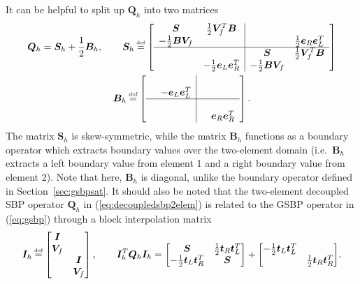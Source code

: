\documentclass[review,onefignum,onetabnum,final]{siamart171218}
\newcommand{\LRs}[1]{\left[ #1 \right]}
\newcommand\myeq{\mathrel{\stackrel{\makebox[0pt]{\mbox{\normalfont\tiny def}}}{=}}}
\begin{document}
It can be helpful to split up $\bm{Q}_h$ into two matrices
\begin{gather*}
\bm{Q}_h = \bm{S}_h + \frac{1}{2}\bm{B}_h, \qquad
\bm{S}_h \myeq \LRs{\begin{array}{cc|cc}
\bm{S} &  \frac{1}{2}\bm{V}_f^T\bm{B} & & \\
 - \frac{1}{2}\bm{B}\bm{V}_f &  & & \frac{1}{2}\bm{e}_R\bm{e}_L^T\\
 \hline
&& \bm{S} &  \frac{1}{2}\bm{V}_f^T\bm{B} \\
& -\frac{1}{2}\bm{e}_L\bm{e}_R^T &  - \frac{1}{2}\bm{B}\bm{V}_f &\\
\end{array}}\\
\bm{B}_h \myeq \LRs{\begin{array}{cc|cc}
&  & & \\
 & -\bm{e}_L\bm{e}_L^T & & \\
 \hline
&&  &  \\
&  && \bm{e}_R\bm{e}_R^T\\
\end{array}}.
\end{gather*}
The matrix $\bm{S}_h$ is skew-symmetric, while the matrix $\bm{B}_h$ functions as a boundary operator which extracts boundary values over the two-element domain (i.e.\ $\bm{B}_h$ extracts a left boundary value from element 1 and a right boundary value from element 2).  Note that here, $\bm{B}_h$ is diagonal, unlike the boundary operator defined in Section~\ref{sec:gsbpsat}.  It should also be noted that the two-element decoupled SBP operator $\bm{Q}_h$ in (\ref{eq:decoupledsbp2elem}) is related to the GSBP operator in (\ref{eq:gsbp}) through a block interpolation matrix
\[
\bm{I}_h \myeq \begin{bmatrix}
\bm{I} &\\
\bm{V}_f &\\
&\bm{I}\\
&\bm{V}_f\\
\end{bmatrix}, \qquad \bm{I}_h^T\bm{Q}_h\bm{I}_h = {\begin{bmatrix}
\bm{S}  & \frac{1}{2}\bm{t}_R\bm{t}_L^T \\
- \frac{1}{2}\bm{t}_L\bm{t}_R^T & \bm{S}
\end{bmatrix}}
+
{\begin{bmatrix}
-\frac{1}{2}\bm{t}_L\bm{t}_L^T  & \\
 & \frac{1}{2} \bm{t}_R\bm{t}_R^T
\end{bmatrix}}.
\]
\end{document}
